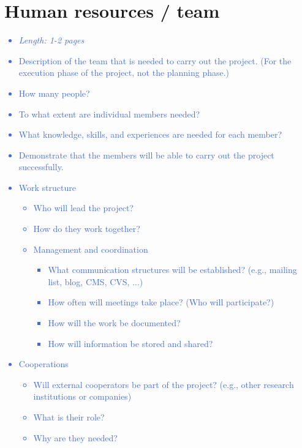 \documentclass[a4paper,11pt]{article}
\providecommand*{\note}[1]{\small \textcolor{RoyalBlue}{\begin{minipage}{\textwidth}{#1}\end{minipage}}}
\begin{document}
\section{Human resources / team}
\label{sect:team}

\note{
\begin{itemize}
\item {\em Length: 1-2 pages}
\item Description of the team that is needed to carry out the project. (For the execution phase of the project, not the planning phase.)
\item How many people?
\item To what extent are individual members needed?
\item What knowledge, skills, and experiences are needed for each member?
\item Demonstrate that the members will be able to carry out the project successfully.
\item Work structure
	\begin{itemize}
	\item     Who will lead the project?
	\item     How do they work together?
	\item     Management and coordination
		\begin{itemize}
		\item 	        What communication structures will be established? (e.g., mailing list, blog, CMS, CVS, ...)
		\item 	        How often will meetings take place? (Who will participate?)
		\item 	        How will the work be documented?
		\item 	        How will information be stored and shared?
		\end{itemize}
	\end{itemize}
\item Cooperations
	\begin{itemize}
	\item     Will external cooperators be part of the project? (e.g., other research institutions or companies)
	\item     What is their role?
	 \item    Why are they needed?
	\end{itemize}
\end{itemize}
}

\end{document}
